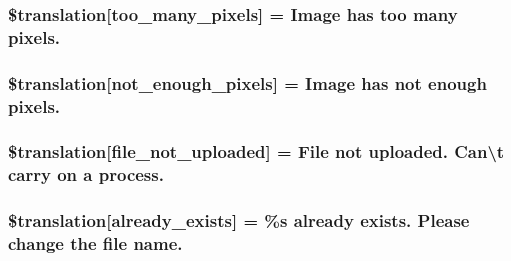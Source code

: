 \subsubsection[{\$translation}]{\setlength{\rightskip}{0pt plus 5cm}\$translation\mbox{[}\textquotesingle{}too\+\_\+many\+\_\+pixels\textquotesingle{}\mbox{]} = \textquotesingle{}Image has too many pixels.\textquotesingle{}}\label{class_8upload_8xx___x_x_8php_aa4051ef64e94a3f8295c63cf85544016}
\hypertarget{class_8upload_8xx___x_x_8php_a1fe342c27ce61f4ff4e0120ba647033e}{}
\subsubsection[{\$translation}]{\setlength{\rightskip}{0pt plus 5cm}\$translation\mbox{[}\textquotesingle{}not\+\_\+enough\+\_\+pixels\textquotesingle{}\mbox{]} = \textquotesingle{}Image has not enough pixels.\textquotesingle{}}\label{class_8upload_8xx___x_x_8php_a1fe342c27ce61f4ff4e0120ba647033e}
\hypertarget{class_8upload_8xx___x_x_8php_a4ce76e7be0b3a03c2b47f6d70c21832e}{}
\subsubsection[{\$translation}]{\setlength{\rightskip}{0pt plus 5cm}\$translation\mbox{[}\textquotesingle{}file\+\_\+not\+\_\+uploaded\textquotesingle{}\mbox{]} = \textquotesingle{}File not uploaded. Can\textbackslash{}\textquotesingle{}t carry on a process.\textquotesingle{}}\label{class_8upload_8xx___x_x_8php_a4ce76e7be0b3a03c2b47f6d70c21832e}
\hypertarget{class_8upload_8xx___x_x_8php_afd84e910217f04139f567c41e292afa5}{}
\subsubsection[{\$translation}]{\setlength{\rightskip}{0pt plus 5cm}\$translation\mbox{[}\textquotesingle{}already\+\_\+exists\textquotesingle{}\mbox{]} = \textquotesingle{}\%s already exists. Please change the file name.\textquotesingle{}}\label{class_8upload_8xx___x_x_8php_afd84e910217f04139f567c41e292afa5}
\hypertarget{class_8upload_8xx___x_x_8php_ab0fa87a88aba2624004581eed0633325}{}
